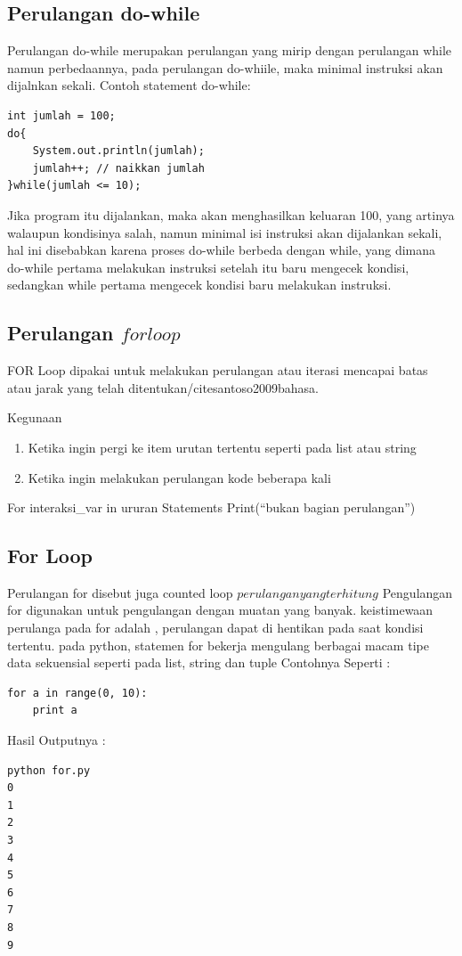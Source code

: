 \subsection{Perulangan do-while}
Perulangan do-while merupakan perulangan yang  mirip dengan perulangan while namun perbedaannya\cite{arfian2012rekayasa}, pada perulangan do-whiile, maka minimal instruksi akan dijalnkan sekali. Contoh statement do-while:
\begin{verbatim}
int jumlah = 100;
do{
    System.out.println(jumlah);
    jumlah++; // naikkan jumlah
}while(jumlah <= 10);
\end{verbatim}
Jika program itu dijalankan, maka akan menghasilkan keluaran 100,  yang artinya walaupun kondisinya salah, namun minimal isi instruksi akan dijalankan sekali, hal ini disebabkan karena proses do-while berbeda dengan while,  yang dimana do-while pertama melakukan instruksi setelah itu baru mengecek kondisi, sedangkan while pertama mengecek kondisi baru melakukan instruksi. 

\subsection{Perulangan \(for loop\)}
FOR Loop dipakai untuk melakukan perulangan atau iterasi mencapai batas atau jarak yang telah ditentukan/cite{santoso2009bahasa}.

Kegunaan
\begin{enumerate}
\item Ketika ingin pergi ke item urutan tertentu seperti pada list atau string
\item Ketika ingin melakukan perulangan kode beberapa kali
\end{enumerate}
For interaksi_var in ururan
Statements
Print(“bukan bagian perulangan”) 

\subsection{For Loop}
Perulangan for disebut juga counted loop \(perulangan yang terhitung\)
Pengulangan for digunakan untuk pengulangan dengan muatan yang banyak\cite{van2007python}.
keistimewaan perulanga pada for adalah , perulangan dapat di hentikan pada saat kondisi tertentu. pada python, statemen for bekerja mengulang berbagai macam tipe data sekuensial seperti pada list, string dan tuple
Contohnya Seperti :
\begin{verbatim}
for a in range(0, 10):
	print a
\end{verbatim}
Hasil Outputnya :
\begin{verbatim}
python for.py
0
1
2
3
4
5
6
7
8
9
\end{verbatim}


